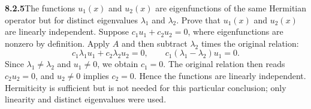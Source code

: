 \par\bigskip
\noindent\textbf{8.2.5}\quad The functions $u_{1}(x)$ and $u_{2}(x)$ are
eigenfunctions of the same Hermitian operator but for distinct eigenvalues
$\lambda_{1}$ and $\lambda_{2}$. Prove that $u_{1}(x)$ and $u_{2}(x)$ are
linearly independent.
\solution
Suppose $c_1u_1+c_2u_2=0$, where eigenfunctions are nonzero by
definition.  Apply $A$ and then subtract $\lambda_2$ times the original
relation:
\[
c_1\lambda_1u_1+c_2\lambda_2u_2=0,
\qquad c_1(\lambda_1-\lambda_2)u_1=0.
\]
Since $\lambda_1\ne\lambda_2$ and $u_1\ne0$, we obtain $c_1=0$.
The original relation then reads $c_2u_2=0$, and $u_2\ne0$ implies
$c_2=0$.  Hence the functions are
linearly independent.  Hermiticity is sufficient but is not needed
for this particular conclusion; only linearity and distinct eigenvalues
were used.


